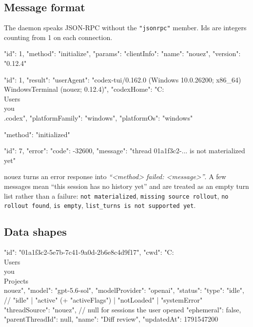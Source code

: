 \documentclass[10pt,a4paper]{article}
\newcommand{\code}[1]{\texttt{#1}}
\begin{document}
\subsection{Message format}

The daemon speaks JSON-RPC without the \code{"jsonrpc"} member. Ids are integers counting from 1
on each connection.

\begin{wire}
{"id": 1, "method": "initialize", "params": {"clientInfo": {"name": "nouez", "version": "0.12.4"}}}
\end{wire}
\begin{wire}
{"id": 1, "result": {
  "userAgent": "codex-tui/0.162.0 (Windows 10.0.26200; x86_64) WindowsTerminal (nouez; 0.12.4)",
  "codexHome": "C:\\Users\\you\\.codex",
  "platformFamily": "windows", "platformOs": "windows"}}
\end{wire}
\begin{wire}
{"method": "initialized"}
\end{wire}
\begin{wire}
{"id": 7, "error": {"code": -32600, "message": "thread 01a1f3c2-... is not materialized yet"}}
\end{wire}

nouez turns an error response into \emph{``\textless method\textgreater{} failed: \textless message\textgreater''}. A few
messages mean ``this session has no history yet'' and are treated as an empty turn list rather
than a failure: \code{not materialized}, \code{missing source rollout}, \code{no rollout found},
\code{is empty}, \code{list\_turns is not supported yet}.

\subsection{Data shapes}

\begin{wire}
{"id": "01a1f3c2-5e7b-7c41-9a0d-2b6e8c4d9f17",
 "cwd": "C:\\Users\\you\\Projects\\nouez",
 "model": "gpt-5.6-sol", "modelProvider": "openai",
 "status": {"type": "idle"},             // "idle" | "active" (+ "activeFlags") | "notLoaded" | "systemError"
 "threadSource": "nouez",                // null for sessions the user opened
 "ephemeral": false, "parentThreadId": null,
 "name": "Diff review", "updatedAt": 1791547200}
\end{wire}
\end{document}
